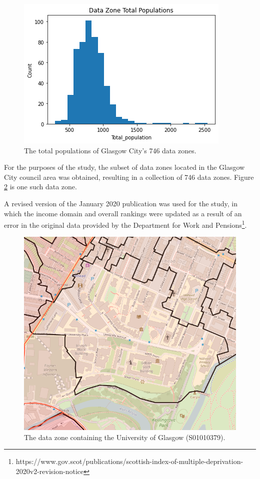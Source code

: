 \documentclass{thesis}
\begin{document}
\begin{figure}[h]
    \centering
    \includegraphics[scale=0.75]{images/dz-total-population.png}
    \caption{The total populations of Glasgow City's 746 data zones.}
    \label{fig:dz-total-populations}
\end{figure}

For the purposes of the study, the subset of data zones located in the Glasgow City council area was obtained, resulting in a collection of 746 data zones. Figure \ref{fig:glasgow-uni-dz} is one such data zone.

A revised version of the January 2020 publication was used for the study, in which the income domain and overall rankings were updated as a result of an error in the original data provided by the Department for Work and Pensions\footnote{https://www.gov.scot/publications/scottish-index-of-multiple-deprivation-2020v2-revision-notice}.

\begin{figure}[h]
    \centering
    \includegraphics[scale=0.5]{images/glasgow-uni-ward.PNG}
    \caption{The data zone containing the University of Glasgow (S01010379).}
    \label{fig:glasgow-uni-dz}
\end{figure}
\end{document}
